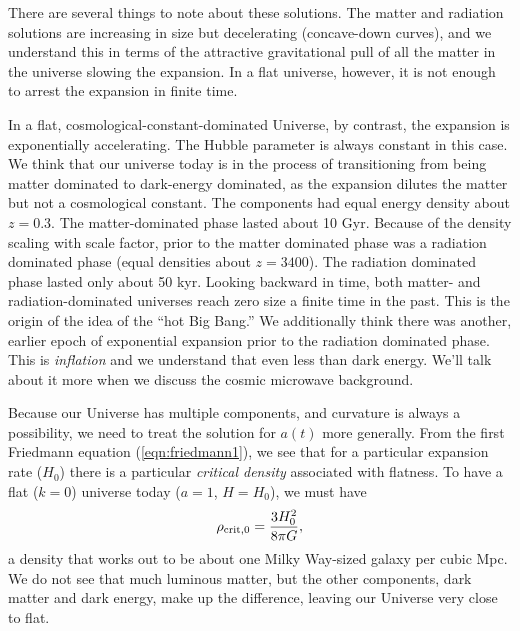 There are several things to note about these solutions.  The matter and radiation solutions are increasing in size but decelerating (concave-down curves), and we understand this in terms of the attractive gravitational pull of all the matter in the universe slowing the expansion.  In a flat universe, however, it is not enough to arrest the expansion in finite time.


In a flat, cosmological-constant-dominated Universe, by contrast, the expansion is exponentially accelerating.  The Hubble parameter is always constant in this case.   We think that our universe today is in the process of transitioning from being matter dominated to dark-energy dominated, as the expansion dilutes the matter but not a cosmological constant.  The components had equal energy density about $z=0.3$.  The matter-dominated phase lasted about 10 Gyr.  Because of the density scaling with scale factor, prior to the matter dominated phase was a radiation dominated phase (equal densities about $z=3400$).  The radiation dominated phase lasted only about 50 kyr.  Looking backward in time, both matter- and radiation-dominated universes reach zero size a finite time in the past.  This is the origin of the idea of the ``hot Big Bang.''  We additionally think there was another, earlier epoch of exponential expansion prior to the radiation dominated phase.  This is \textit{inflation} and we understand that even less than dark energy.  We'll talk about it more when we discuss the cosmic microwave background.

Because our Universe has multiple components, and curvature is always a possibility, we need to treat the solution for $a(t)$ more generally.  From the first Friedmann equation (\ref{eqn:friedmann1}), we see that for a particular expansion rate ($H_0$) there is a particular \textit{critical density} associated with flatness.  To have a flat ($k=0$) universe today ($a=1$, $H=H_0$), we must have
\begin{equation}
  \rho_{\rm crit,0}   = \frac{3 H_0^2}{8\pi G},
\end{equation}
a density that works out to be about one Milky Way-sized galaxy per cubic Mpc.  We do not see that much luminous matter, but the other components, dark matter and dark energy, make up the difference, leaving our Universe very close to flat.

